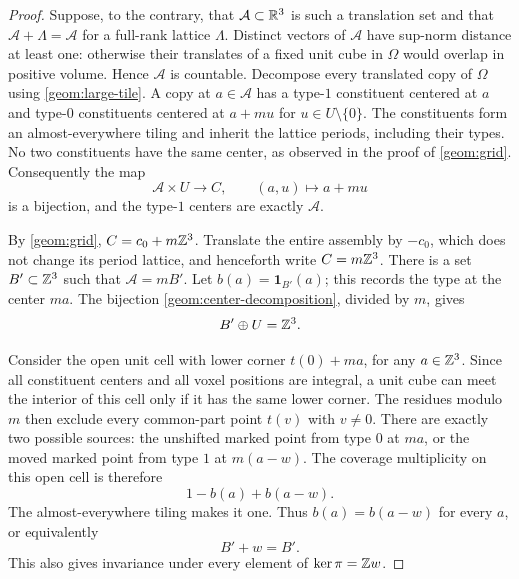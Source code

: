 \begin{proof}
Suppose, to the contrary, that $\mathcal A\subset\mathbb R^3$ is such a
translation set and that $\mathcal A+\Lambda=\mathcal A$ for a
full-rank lattice $\Lambda$.  Distinct vectors of $\mathcal A$ have
sup-norm distance at least one: otherwise their translates of a fixed
unit cube in $\Omega$ would overlap in positive volume.  Hence
$\mathcal A$ is countable.  Decompose every translated copy of
$\Omega$ using \cref{geom:large-tile}.  A copy at $a\in\mathcal A$
has a type-$1$ constituent centered at $a$ and type-$0$ constituents
centered at $a+mu$ for $u\in U\setminus\{0\}$.  The constituents
form an almost-everywhere tiling and inherit the lattice periods,
including their types.  No two constituents have the same center,
as observed in the proof of \cref{geom:grid}.  Consequently the map
\begin{equation}
 \mathcal A\times U\longrightarrow C,\qquad(a,u)\longmapsto a+mu
 \label{geom:center-decomposition}
\end{equation}
is a bijection, and the type-$1$ centers are exactly $\mathcal A$.

By \cref{geom:grid}, $C=c_0+m\mathbb Z^3$.  Translate the entire assembly
by $-c_0$, which does not change its period lattice, and henceforth
write $C=m\mathbb Z^3$.  There is a set $B'\subset\mathbb Z^3$ such that
$\mathcal A=mB'$.  Let $b(a)=\mathbf{1}_{B'}(a)$; this records the
type at the center $ma$.  The bijection
\eqref{geom:center-decomposition}, divided by $m$, gives
\begin{equation}
 B'\oplus U=\mathbb Z^3.
 \label{geom:upstairs-tiling}
\end{equation}

Consider the open unit cell with lower corner $t(0)+ma$, for any
$a\in\mathbb Z^3$.  Since all constituent centers and all voxel positions
are integral, a unit cube can meet the interior of this cell only
if it has the same lower corner.  The residues modulo $m$ then
exclude every common-part point $t(v)$ with $v\ne0$.  There are
exactly two possible sources: the unshifted marked point from
type $0$ at $ma$, or the moved marked point from type $1$ at
$m(a-w)$.  The coverage multiplicity on this open cell is therefore
\[
 1-b(a)+b(a-w).
\]
The almost-everywhere tiling makes it one.  Thus $b(a)=b(a-w)$ for
every $a$, or equivalently
\begin{equation}
 B'+w=B'.
 \label{geom:kernel-invariance}
\end{equation}
This also gives invariance under every element of $\ker\pi=\mathbb Z w$.


\end{proof}
